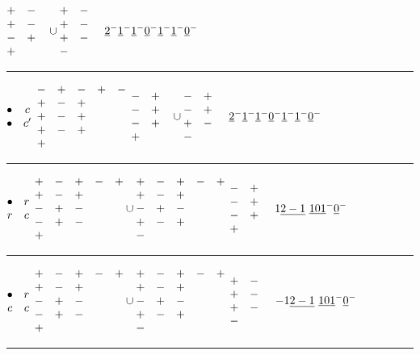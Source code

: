 \documentclass[11pt ,reqno]{amsart}
\begin{document}
\qquad $\begin{matrix} +&-\\+&-\\-&+\\+&&\end{matrix}\cup\begin{matrix} +&-\\+&-\\+&-\\-&&\end{matrix}$
\qquad ${\underline{2}}^-{\underline{1}}^-{\underline{1}}^-{\underline{0}}^-{\underline{1}}^-{\underline{1}}^-{\underline{0}}^-$
\hfill
\medskip
\hrule
\medskip
$\begin{matrix} \bullet&c\\ \bullet&c'\end{matrix}$\qquad  
$\begin{matrix} -&+&-&+&-\\ +&-&+&&\\+&-&+&&\\+&-&+&&\\+&&&&\end{matrix}$
\qquad $\begin{matrix} -&+\\-&+\\-&+\\+&&\end{matrix}\cup\begin{matrix} -&+\\-&+\\+&-\\-&&\end{matrix}$
\qquad ${\underline{2}}^-{\underline{1}}^-{\underline{1}}^-{\underline{0}}^-{\underline{1}}^-{\underline{1}}^-{\underline{0}}^-$
\hfill
\medskip
\hrule
\medskip
$\begin{matrix} \bullet&r\\ r&c\end{matrix}$\qquad  
$\begin{matrix} +&-&+&-&+\\ +&-&+&&\\-&+&-&&\\-&+&-&&\\+&&&&\end{matrix}\cup
\begin{matrix} +&-&+&-&+\\ +&-&+&&\\-&+&-&&\\+&-&+&&\\-&&&&\end{matrix}$
\qquad $\begin{matrix} -&+\\-&+\\-&+\\+&&\end{matrix}$
\qquad $1{\underline{2-1}}\ {\underline{10}}{\underline{1}}^-{\underline{0}}^-$
\hfill
\medskip
\hrule
\medskip
$\begin{matrix} \bullet&r\\ c&c\end{matrix}$\qquad  
$\begin{matrix} +&-&+&-&+\\ +&-&+&&\\-&+&-&&\\-&+&-&&\\+&&&&\end{matrix}\cup
\begin{matrix} +&-&+&-&+\\ +&-&+&&\\-&+&-&&\\+&-&+&&\\-&&&&\end{matrix}$
\qquad $\begin{matrix} +&-\\+&-\\+&-\\-&&\end{matrix}$
\qquad $-1{\underline{2-1}}\ {\underline{10}}{\underline{1}}^-{\underline{0}}^-$ 
\hfill
\medskip
\hrule
\end{document}
